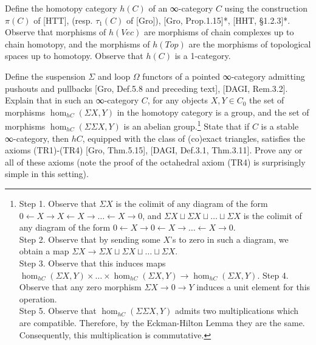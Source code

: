 \documentclass[a4paper]{amsart}
\numberwithin{figure}{section}
\theoremstyle{theorem}
\theoremstyle{definition}
\newcommand{\Top}{{Top}}
\newcommand{\grVec}{{Vec}}
\begin{document}
Define the homotopy category $h(C)$ of an ∞-category $C$ using the construction $\pi(C)$ of [HTT], (resp. $\tau_1(C)$ of [Gro]), [Gro, Prop.1.15]*, [HHT, §1.2.3]*. %
Observe that morphisms of $h(\grVec)$ are morphisms of chain complexes up to chain homotopy, and the morphisms of $h(\Top)$ are the morphisms of topological spaces up to homotopy. %
Observe that $h(C)$ is a 1-category. %

Define the suspension $\Sigma$ and loop $\Omega$ functors of a pointed ∞-category admitting pushouts and pullbacks [Gro, Def.5.8 and preceding text], [DAGI, Rem.3.2]. %
Explain that in such an ∞-category $C$, for any objects $X, Y \in C_0$ the set of morphisms $\hom_{hC}(\Sigma X, Y)$ in the homotopy category is a group, and the set of morphisms $\hom_{hC}(\Sigma \Sigma X, Y)$ is an abelian group.\footnote{
Step 1. Observe that $\Sigma X$ is the colimit of any diagram of the form $0 {\leftarrow} X {\rightarrow} X {\leftarrow} X {\rightarrow} \dots {\leftarrow} X {\rightarrow} 0$, and $\Sigma X \sqcup \Sigma X \sqcup \dots \sqcup \Sigma X$ is the colimit of any diagram of the form $0 {\leftarrow} X {\rightarrow} 0 {\leftarrow} X {\rightarrow} \dots {\leftarrow} X {\rightarrow} 0$. \\
Step 2. Observe that by sending some $X$'s to zero in such a diagram, we obtain a map $\Sigma X \to \Sigma X \sqcup \Sigma X \sqcup \dots \sqcup \Sigma X$. \\
Step 3. Observe that this induces maps $\hom_{hC}(\Sigma X, Y) \times \dots \times \hom_{hC}(\Sigma X, Y) \to \hom_{hC}(\Sigma X, Y)$.
Step 4. Observe that any zero morphism $\Sigma X \to 0 \to Y$ induces a unit element for this operation. \\
Step 5. Observe that $\hom_{hC}(\Sigma \Sigma X, Y)$ admits two multiplications which are compatible. Therefore, by the Eckman-Hilton Lemma they are the same. Consequently, this multiplication is commutative. 
} %
State that if $C$ is a stable ∞-category, then $hC$, equipped with the class of (co)exact triangles, satisfies the axioms (TR1)-(TR4) [Gro, Thm.5.15], [DAGI, Def.3.1, Thm.3.11]. %
Prove any or all of these axioms (note the proof of the octahedral axiom (TR4) is surprisingly simple in this setting). %



%
%
%
%
%
%
%
%
%
%
%
%
\end{document}
